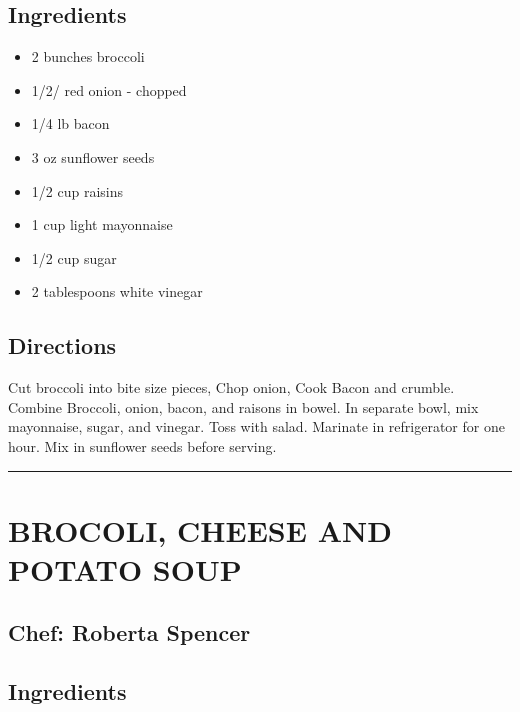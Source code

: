 \documentclass[
]{book}
\providecommand{\tightlist}{%
  \setlength{\itemsep}{0pt}\setlength{\parskip}{0pt}}
\begin{document}
\hypertarget{ingredients-14}{%
\subsection*{Ingredients}\label{ingredients-14}}


\begin{itemize}
\tightlist
\item
  2 bunches broccoli
\item
  1/2/ red onion - chopped
\item
  1/4 lb bacon
\item
  3 oz sunflower seeds
\item
  1/2 cup raisins
\item
  1 cup light mayonnaise
\item
  1/2 cup sugar
\item
  2 tablespoons white vinegar
\end{itemize}

\hypertarget{directions-14}{%
\subsection*{Directions}\label{directions-14}}


Cut broccoli into bite size pieces, Chop onion, Cook Bacon and crumble. Combine Broccoli, onion, bacon, and raisons in bowel. In separate bowl, mix mayonnaise, sugar, and vinegar. Toss with salad. Marinate in refrigerator for one hour. Mix in sunflower seeds before serving.

\begin{center}\rule{0.5\linewidth}{0.5pt}\end{center}

\hypertarget{brocoli-cheese-and-potato-soup}{%
\section*{BROCOLI, CHEESE AND POTATO SOUP}\label{brocoli-cheese-and-potato-soup}}


\hypertarget{chef-roberta-spencer-1}{%
\subsection*{Chef: Roberta Spencer}\label{chef-roberta-spencer-1}}


\hypertarget{ingredients-15}{%
\subsection*{Ingredients}\label{ingredients-15}}
\end{document}
